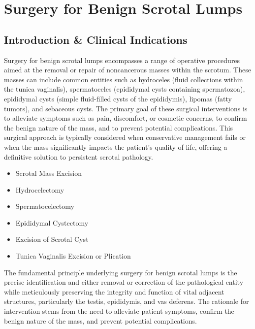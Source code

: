\chapter{Surgery for Benign Scrotal Lumps}

\section*{Introduction \& Clinical Indications}
Surgery for benign scrotal lumps encompasses a range of operative procedures aimed at the removal or repair of noncancerous masses within the scrotum. These masses can include common entities such as hydroceles (fluid collections within the tunica vaginalis), spermatoceles (epididymal cysts containing spermatozoa), epididymal cysts (simple fluid-filled cysts of the epididymis), lipomas (fatty tumors), and sebaceous cysts. The primary goal of these surgical interventions is to alleviate symptoms such as pain, discomfort, or cosmetic concerns, to confirm the benign nature of the mass, and to prevent potential complications. This surgical approach is typically considered when conservative management fails or when the mass significantly impacts the patient's quality of life, offering a definitive solution to persistent scrotal pathology.

\begin{itemize}
  \item Scrotal Mass Excision
  \item Hydrocelectomy
  \item Spermatocelectomy
  \item Epididymal Cystectomy
  \item Excision of Scrotal Cyst
  \item Tunica Vaginalis Excision or Plication
\end{itemize}

The fundamental principle underlying surgery for benign scrotal lumps is the precise identification and either removal or correction of the pathological entity while meticulously preserving the integrity and function of vital adjacent structures, particularly the testis, epididymis, and vas deferens. The rationale for intervention stems from the need to alleviate patient symptoms, confirm the benign nature of the mass, and prevent potential complications.

